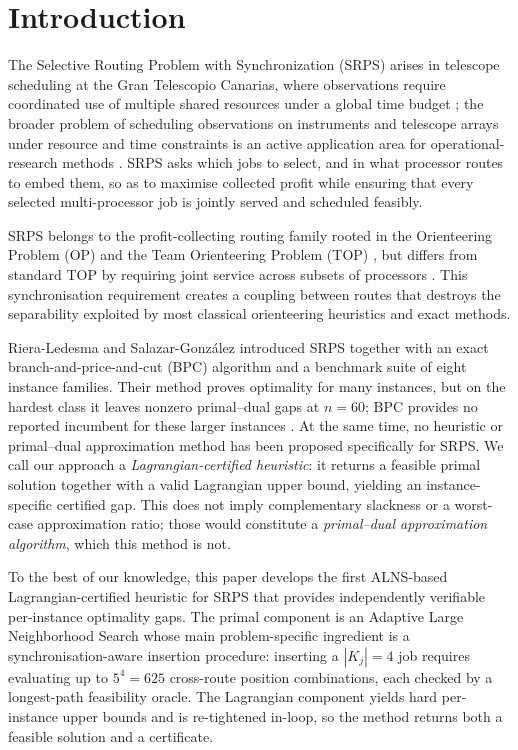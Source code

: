 \documentclass[preprint,12pt]{elsarticle}
\begin{document}
\section{Introduction}

The Selective Routing Problem with Synchronization (SRPS) arises in telescope scheduling at the Gran Telescopio Canarias, where observations require coordinated use of multiple shared resources under a global time budget \cite{RieraLedesma2021SRPS}; the broader problem of scheduling observations on instruments and telescope arrays under resource and time constraints is an active application area for operational-research methods \cite{Ma2025RadioTelescope}. SRPS asks which jobs to select, and in what processor routes to embed them, so as to maximise collected profit while ensuring that every selected multi-processor job is jointly served and scheduled feasibly.

SRPS belongs to the profit-collecting routing family \cite{Feillet2005TSPProfits} rooted in the Orienteering Problem (OP) \cite{Golden1987OP} and the Team Orienteering Problem (TOP) \cite{Chao1996TOP}, but differs from standard TOP by requiring joint service across subsets of processors \cite{Vansteenwegen2011Orienteering,Gunawan2016OPSurvey}. This synchronisation requirement creates a coupling between routes that destroys the separability exploited by most classical orienteering heuristics and exact methods.

Riera-Ledesma and Salazar-Gonz\'alez \cite{RieraLedesma2021SRPS} introduced SRPS together with an exact branch-and-price-and-cut (BPC) algorithm and a benchmark suite of eight instance families. Their method proves optimality for many instances, but on the hardest class it leaves nonzero primal--dual gaps at $n=60$; BPC provides no reported incumbent for these larger instances \cite{RieraLedesma2021SRPS}. At the same time, no heuristic or primal--dual approximation method has been proposed specifically for SRPS. We call our approach a \emph{Lagrangian-certified heuristic}: it returns a feasible primal solution together with a valid Lagrangian upper bound, yielding an instance-specific certified gap. This does not imply complementary slackness or a worst-case approximation ratio; those would constitute a \emph{primal--dual approximation algorithm}, which this method is not.

To the best of our knowledge, this paper develops the first ALNS-based Lagrangian-certified heuristic for SRPS that provides independently verifiable per-instance optimality gaps. The primal component is an Adaptive Large Neighborhood Search whose main problem-specific ingredient is a synchronisation-aware insertion procedure: inserting a $|K_j|=4$ job requires evaluating up to $5^4=625$ cross-route position combinations, each checked by a longest-path feasibility oracle. The Lagrangian component yields hard per-instance upper bounds and is re-tightened in-loop, so the method returns both a feasible solution and a certificate.
\end{document}
